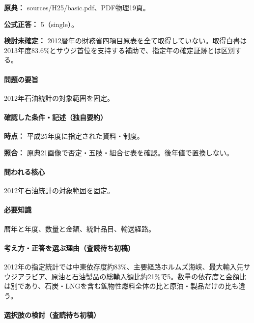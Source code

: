 \noindent\textbf{原典：} sources/H25/basic.pdf、PDF物理19頁。

\textbf{公式正答：} 5（single）。

\par\textbf{検討未確定：} 2012暦年の財務省四項目原表を全て取得していない。取得白書は2013年度83.6\%とサウジ首位を支持する補助で、指定年の確定証跡とは区別する。

\paragraph{問題の要旨} 2012年石油統計の対象範囲を固定。

\paragraph{確認した条件・記述（独自要約）}\mbox{}\par

\noindent\textbf{時点：} 平成25年度に指定された資料・制度。\par

\noindent\textbf{照合：} 原典21画像で否定・五肢・組合せ表を確認。後年値で置換しない。\par

\paragraph{問われる核心} 2012年石油統計の対象範囲を固定。

\paragraph{必要知識} 暦年と年度、数量と金額、統計品目、輸送経路。

\paragraph{考え方・正答を選ぶ理由（査読待ち初稿）} 2012年の指定統計では中東依存度約83\%、主要経路ホルムズ海峡、最大輸入先サウジアラビア、原油と石油製品の総輸入額比約21\%で5。数量の依存度と金額比は別であり、石炭・LNGを含む鉱物性燃料全体の比と原油・製品だけの比も違う。

\paragraph{選択肢の検討（査読待ち初稿）}\mbox{}\par

